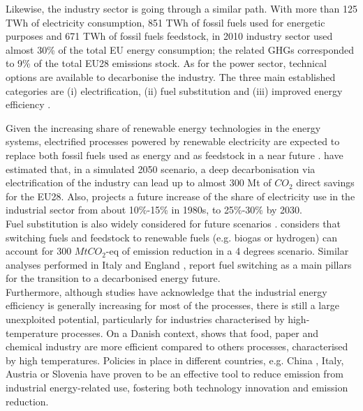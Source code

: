 \documentclass[review]{elsarticle}
\begin{document}
Likewise, the industry sector is going through a similar path. 
With more than 125 TWh of electricity consumption, 851 TWh of fossil fuels used for energetic purposes and 671 TWh of fossil fuels feedstock, in 2010 industry sector used almost 30\% of the total EU energy consumption; the related GHGs corresponded to 9\% of the total EU28 emissions stock\cite{Eurostat2017,Lechtenbohmer2016}.
As for the power sector, technical options are available to decarbonise the industry. The three main established categories are (i) electrification, (ii) fuel substitution and (iii) improved energy efficiency \cite{Lechtenbohmer2016, Akashi2011, IRENA2014}.

Given the increasing share of renewable energy technologies in the energy systems, electrified processes powered by renewable electricity are expected to replace both fossil fuels used as energy and as feedstock in a near future \cite{Lechtenbohmer2015, EnergyCommission2017, Energikommissionen2017, Lin2017}. \cite{Lechtenbohmer2016} have estimated that, in a simulated 2050 scenario, a deep decarbonisation via electrification of the industry can lead up to almost 300 Mt of $CO_2$ direct savings for the EU28. Also, \cite{IRENA2014} projects a future increase of the share of electricity use in the industrial sector from about 10\%-15\% in 1980s, to 25\%-30\% by 2030.
\\
Fuel substitution is also widely considered for future scenarios \cite{Lin2016,Rehfeldt2016}. \cite{Iea2012} considers that switching fuels and feedstock to renewable fuels (e.g. biogas or hydrogen) can account for 300 $MtCO_2$-eq of emission reduction in a 4 degrees scenario. Similar analyses performed in Italy \cite{Enea2016} and England \cite{Pye2015}, report fuel switching as a main pillars for the transition to a decarbonised energy future.
\\
Furthermore, although studies have acknowledge that the industrial energy efficiency is generally increasing for most of the processes, there is still a large unexploited potential, particularly for industries characterised by high-temperature processes. On a Danish context, \cite{Buhler2016} shows that food, paper and chemical industry are more efficient compared to others processes, characterised by high temperatures. Policies in place in different countries, e.g. China \cite{Li2017,Zheng2017,Lin2017a,Miao2018,Guo2017}, Italy\cite{MazziottiGomezdeTeran2017}, Austria \cite{Karner2015} or Slovenia \cite{Pusnik2017} have proven to be an effective tool to reduce emission from industrial energy-related use, fostering both technology innovation and emission reduction.  
\\
\end{document}
